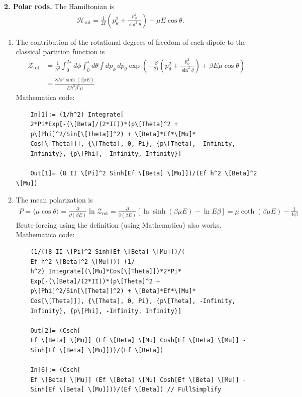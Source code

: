 \documentclass{article}
\theoremstyle{definition}
\newcommand{\p}{\partial}
\newcommand{\ham}{\mathcal{H}}
\newcommand{\be}{\beta}
\newcommand{\f}[2]{\frac{#1}{#2}}
\newcommand{\lp}{\left(}
\newcommand{\rp}{\right)}
\newcommand{\lb}{\left[}
\newcommand{\rb}{\right]}
\begin{document}
\noindent \textbf{2. Polar rods.} The Hamiltonian is 
\begin{align*}
\ham_\text{rot} = \f{1}{2I}\lp p_\theta^2 + \f{p_\phi^2}{\sin^2\theta} \rp - \mu E \cos\theta. 
\end{align*}

\begin{enumerate}[label=(\alph*)]
	
	
	\item The contribution of the rotational degrees of freedom of each dipole to the
	classical partition function is 
	\begin{align*}
	\mathcal{Z}_\text{rot} 
	&= \f{1}{h^2}\int^{2\pi}_0 d\phi \int^\pi_0 d\theta \int dp_\phi\,dp_\theta \exp\lp -\f{\be}{2I} \lp p^2_\theta + \f{p_\phi^2}{\sin^2\theta}\rp + \be E\mu\cos\theta\rp\\
	&= \boxed{\f{8I\pi^2\sinh(\be\mu E)}{Eh^2\be^2 \mu}}
 	\end{align*}
 	Mathematica code:
 	\begin{lstlisting}
 	In[1]:= (1/h^2) Integrate[
 	2*Pi*Exp[-(\[Beta]/(2*II))*(p\[Theta]^2 + 
 	p\[Phi]^2/Sin[\[Theta]]^2) + \[Beta]*Ef*\[Mu]*
 	Cos[\[Theta]]], {\[Theta], 0, Pi}, {p\[Theta], -Infinity, 
 	Infinity}, {p\[Phi], -Infinity, Infinity}]
 	
 	Out[1]= (8 II \[Pi]^2 Sinh[Ef \[Beta] \[Mu]])/(Ef h^2 \[Beta]^2 \[Mu])
 	\end{lstlisting}
	
	\item The mean polarization is 
	\begin{align*}
	P = \langle \mu \cos\theta \rangle = \f{\p}{\p (\be E)}\ln \mathcal{Z}_\text{rot} = \f{\p}{\p (\be E)}\lb \ln \sinh(\be \mu E) - \ln E\be \rb = \boxed{\mu \coth(\be \mu E) - \f{1}{E\be}}
	\end{align*}
	Brute-forcing using the definition (using Mathematica) also works. Mathematica code:
	\begin{lstlisting}
	(1/((8 II \[Pi]^2 Sinh[Ef \[Beta] \[Mu]])/(
	Ef h^2 \[Beta]^2 \[Mu]))) (1/
	h^2) Integrate[(\[Mu]*Cos[\[Theta]])*2*Pi*
	Exp[-(\[Beta]/(2*II))*(p\[Theta]^2 + 
	p\[Phi]^2/Sin[\[Theta]]^2) + \[Beta]*Ef*\[Mu]*
	Cos[\[Theta]]], {\[Theta], 0, Pi}, {p\[Theta], -Infinity, 
	Infinity}, {p\[Phi], -Infinity, Infinity}]
	
	Out[2]= (Csch[
	Ef \[Beta] \[Mu]] (Ef \[Beta] \[Mu] Cosh[Ef \[Beta] \[Mu]] - 
	Sinh[Ef \[Beta] \[Mu]]))/(Ef \[Beta])
	
	In[6]:= (Csch[
	Ef \[Beta] \[Mu]] (Ef \[Beta] \[Mu] Cosh[Ef \[Beta] \[Mu]] - 
	Sinh[Ef \[Beta] \[Mu]]))/(Ef \[Beta]) // FullSimplify
	

\end{lstlisting}
\end{enumerate}
\end{document}
